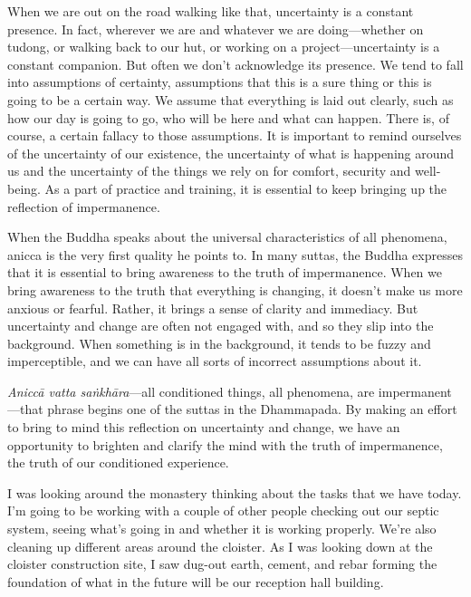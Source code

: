 When we are out on the road walking like that, uncertainty is a 
constant presence. In fact, wherever we are and whatever we are 
doing---whether on tudong, or walking back to our hut, or working on a 
project---uncertainty is a constant companion. But often we don't 
acknowledge its presence. We tend to fall into assumptions of 
certainty, assumptions that this is a sure thing or this is going to be 
a certain way. We assume that everything is laid out clearly, such as 
how our day is going to go, who will be here and what can happen. There 
is, of course, a certain fallacy to those assumptions. It is important 
to remind ourselves of the uncertainty of our existence, the 
uncertainty of what is happening around us and the uncertainty of the 
things we rely on for comfort, security and well-being. As a part of 
practice and training, it is essential to keep bringing up the 
reflection of impermanence.

When the Buddha speaks about the universal characteristics of all 
phenomena, anicca is the very first quality he points to. In many 
suttas, the Buddha expresses that it is essential to bring awareness to 
the truth of impermanence. When we bring awareness to the truth that 
everything is changing, it doesn't make us more anxious or fearful. 
Rather, it brings a sense of clarity and immediacy. But uncertainty and 
change are often not engaged with, and so they slip into the 
background. When something is in the background, it tends to be fuzzy 
and imperceptible, and we can have all sorts of incorrect assumptions 
about it.

\emph{Aniccā vatta saṅkhāra}---all conditioned things, all 
phenomena, are impermanent---that phrase begins one of the suttas in 
the Dhammapada. By making an effort to bring to mind this reflection on 
uncertainty and change, we have an opportunity to brighten and clarify 
the mind with the truth of impermanence, the truth of our conditioned 
experience.


I was looking around the monastery thinking about the tasks that we 
have today. I'm going to be working with a couple of other people 
checking out our septic system, seeing what's going in and whether it 
is working properly. We're also cleaning up different areas around the 
cloister. As I was looking down at the cloister construction site, I 
saw dug-out earth, cement, and rebar forming the foundation of what in 
the future will be our reception hall building.

